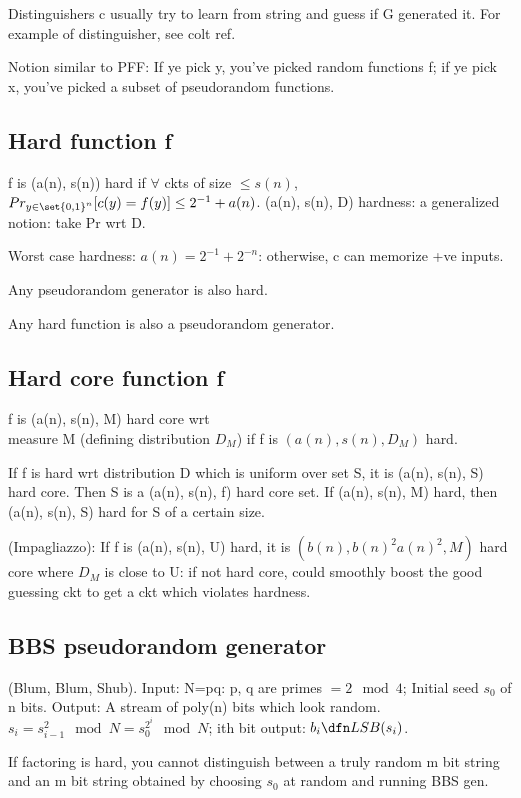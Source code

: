 \documentclass[oneside, article]{memoir}
\begin{document}
Distinguishers c usually try to learn from string and guess if G generated it. For example of distinguisher, see colt ref.

Notion similar to PFF: If ye pick y, you've picked random functions f; if ye pick x, you've picked a subset of pseudorandom functions.

\subsection{Hard function f}
f is (a(n), s(n)) hard if $\forall$ ckts of size $\leq s(n)$, \\
$Pr_{y \in \set{0,1}^{n}}[c(y)=f(y)] \leq 2^{-1} + a(n)$. (a(n), s(n), D) hardness: a generalized notion: take Pr wrt D.

Worst case hardness: $a(n) = 2^{-1} + 2^{-n}$: otherwise, c can memorize +ve inputs.

Any pseudorandom generator is also hard. \why

Any hard function is also a pseudorandom generator. \why

\subsection{Hard core function f}
f is (a(n), s(n), M) hard core wrt \\
measure M (defining distribution $D_{M}$) if f is $(a(n), s(n), D_{M})$ hard.

If f is hard wrt distribution D which is uniform over set S, it is (a(n), s(n), S) hard core. Then S is a (a(n), s(n), f) hard core set. If (a(n), s(n), M) hard, then (a(n), s(n), S) hard for S of a certain size.

(Impagliazzo): If f is (a(n), s(n), U) hard, it is $(b(n), b(n)^{2}a(n)^{2}, M)$ hard core where $D_{M}$ is close to U: if not hard core, could smoothly boost the good guessing ckt to get a ckt which violates hardness.

\subsection{BBS pseudorandom generator}
(Blum, Blum, Shub). Input: N=pq: p, q are primes $= 2 \mod 4$; Initial seed $s_{0}$ of n bits. Output: A stream of poly(n) bits which look random. $s_{i} = s_{i-1}^{2} \mod N  = s_{0}^{2^{i}} \mod N$; ith bit output: $b_{i} \dfn LSB(s_{i})$.

If factoring is hard, you cannot distinguish between a truly random m bit string and an m bit string obtained by choosing $s_{0}$ at random and running BBS gen. \why
\end{document}
